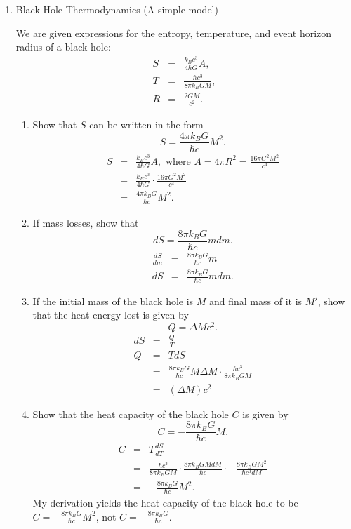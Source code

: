 \documentclass[12pt]{article}
\begin{document}
\begin{enumerate}
	\item Black Hole Thermodynamics (A simple model)

	We are given expressions for the entropy, temperature, and event horizon radius  of a black hole:
	\begin{eqnarray*}
		S &=& \frac{k_B c^3}{4\hbar G}A, \\
		T &=& \frac{\hbar c^3}{8\pi k_B G M}, \\
		R &=& \frac{2GM}{c^2}.
	\end{eqnarray*}

    \begin{enumerate}
        \item Show that $S$ can be written in the form $$S = \frac{4 \pi k_B G}{\hbar c}M^2.$$
            \begin{eqnarray*}
                S &=& \frac{k_B c^3}{4\hbar G}A, \mbox{ where } A = 4 \pi R^2 = \frac{16 \pi G^2 M^2}{c^4}\\
                &=& \frac{k_B c^3}{4\hbar G} \cdot \frac{16\pi G^2 M^2}{c^4} \\
                &=& \frac{4\pi k_B G}{\hbar c} M^2.
            \end{eqnarray*}
        
        \item If mass losses, show that $$dS = \frac{8\pi k_B G}{\hbar c}mdm.$$
            \begin{eqnarray*}
                \frac{dS}{dm} &=& \frac{8\pi k_B G}{\hbar c} m \\
                dS &=& \frac{8\pi k_B G}{\hbar c} mdm.
            \end{eqnarray*}

        \item If the initial mass of the black hole is $M$ and final mass of it is $M'$, show that the heat energy lost is given by $$Q = \Delta Mc^2.$$
            \begin{eqnarray*}
                dS &=& \frac{Q}{T} \\
                Q &=& TdS \\
                &=& \frac{8 \pi k_B G}{\hbar c}M \Delta M \cdot \frac{\hbar c^3}{8 \pi k_B G M} \\
                &=& (\Delta M)c^2
            \end{eqnarray*}

        \item Show that the heat capacity of the black hole $C$ is given by $$C = -\frac{8 \pi k_B G}{\hbar c}M.$$
            \begin{eqnarray*}
                C &=& T \frac{dS}{dT} \\  
                &=& \frac{\hbar c^3}{8\pi k_B G M} \cdot \frac{8\pi k_B G MdM}{\hbar c} \cdot -\frac{8 \pi k_B G M^2}{\hbar c^3 dM} \\
                &=& -\frac{8\pi k_B G}{\hbar c} M^2.
            \end{eqnarray*}
            My derivation yields the heat capacity of the black hole to be $C = -\frac{8\pi k_B G}{\hbar c} M^2$, not $C = -\frac{8 \pi k_B G}{\hbar c}$. \\


\end{enumerate}
\end{enumerate}
\end{document}
